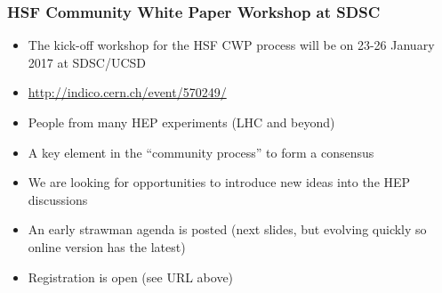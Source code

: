 \begin{frame}
\frametitle{HSF Community White Paper Workshop at SDSC}

\begin{itemize}
\item The kick-off workshop for the HSF CWP process will be on 23-26 January 2017 at SDSC/UCSD
\item \url{http://indico.cern.ch/event/570249/}
\item People from many HEP experiments (LHC and beyond)
\item A key element in the ``community process'' to form a consensus
\item We are looking for opportunities to introduce new ideas into the HEP discussions
\item An early strawman agenda is posted (next slides, but evolving quickly so online version has the latest)
\item Registration is open (see URL above)
\end{itemize}

\end{frame}


